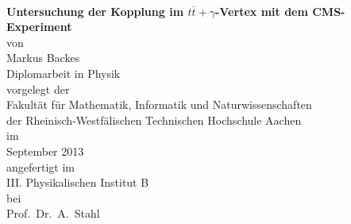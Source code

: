 %
%
%
%

\begin{titlepage}
\thispagestyle{empty}
\begin{center}
   ~ \\
   \vspace{0.2cm}
      {\Huge\bf{Untersuchung der Kopplung im $t\overline{t} + \gamma$-Vertex mit dem CMS-Experiment}\\}
   \vspace{2.0cm}
     von \\
   \vspace{0.5cm}
      {\Large Markus Backes} \\
   \vspace{1.5cm}
      {\Large Diplomarbeit in Physik}\\
   \vspace{1.0cm}
     vorgelegt der \\
   \vspace{0.2cm}
      {\Large Fakult\"at f\"ur Mathematik, Informatik und Naturwissenschaften\\}
      {\Large der Rheinisch-Westf\"alischen Technischen Hochschule Aachen \\}
   \vspace{1.3cm}
     im \\
   \vspace{0.2cm}
      {\Large September 2013}\\
   \vspace{1.5cm}
      angefertigt im \\
   \vspace{0.3cm}
      {\Large III. Physikalischen Institut B \\}
   \vspace{0.3cm}
      bei\\
   \vspace{0.3cm}
      {\Large Prof.~Dr.~A.~Stahl \\}

\end{center}


\end{titlepage}


